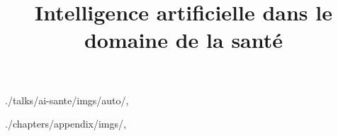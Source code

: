 


\title{Intelligence artificielle dans le domaine de la santé}


\usefootlinefortitlepage

\begin{graphicspathcontext}{{./talks/ai-sante/imgs/auto/},\old}
\end{graphicspathcontext}

\begin{graphicspathcontext}{{./chapters/appendix/imgs/},\old}
\end{graphicspathcontext}




\endinput
